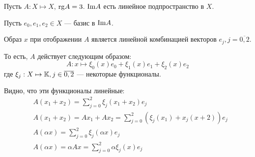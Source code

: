 Пусть $A: X\mapsto X$, $\mathrm{rg} A = 3$.
$\mathrm{Im} A$ есть линейное подпространство в $X$.

Пусть $e_0, e_1, e_2\in X$ --- базис в $\mathrm{Im} A$.

Образ $x$ при отображении $A$
является линейной комбинацией векторов $e_j, j=\overline{0,2}$.

То есть, $A$ действует следующим образом:
$$A: x\mapsto \xi_0(x) e_0 + \xi_1(x) e_1 + \xi_2(x) e_2$$
где $\xi_j: X\mapsto \mathbb{K}, j\in\overline{0,2}$ --- некоторые функционалы.

Видно, что эти функционалы линейные:
\begin{equation*}\begin{aligned}
& A(x_1 + x_2) = \sum_{j=0}^2 \xi_j(x_1 + x_2) e_j \\
& A(x_1 + x_2) = A x_1 + A x_2 = \sum_{j=0}^2 (\xi_j(x_1) + x_j(x+2)) e_j \\
& A(\alpha x) = \sum_{j=0}^2 \xi_j(\alpha x) e_j \\
& A(\alpha x) = \alpha A x = \sum_{j=0}^2 \alpha \xi_j(x) e_j
\end{aligned}\end{equation*}
